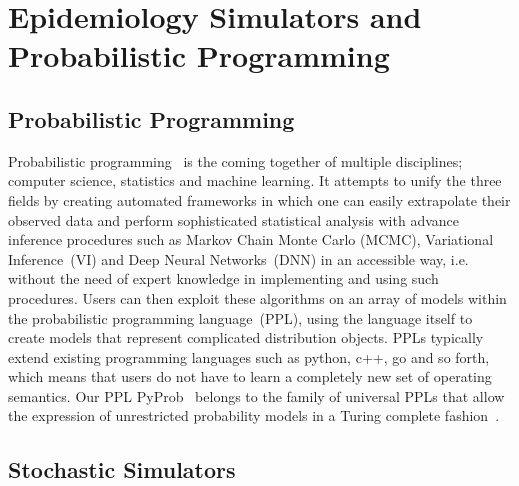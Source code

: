 \documentclass{article}
\begin{document}
\section{Epidemiology Simulators and Probabilistic Programming}
\label{sec:background}



\subsection{Probabilistic Programming}
Probabilistic programming~\cite{gordon2014probabilistic,staton2016semantics,kozen1979semantics} is the coming together of multiple disciplines; computer science, statistics and machine learning. 
It attempts to unify the three fields by creating automated frameworks in which one can easily extrapolate their observed data and perform sophisticated statistical analysis with advance inference procedures such as 
Markov Chain Monte Carlo (MCMC), Variational Inference~(VI) and Deep Neural Networks~(DNN) in an accessible way, i.e. without the need of expert knowledge in implementing and using such procedures.
Users can then exploit these algorithms on an array of models
within the probabilistic programming language~(PPL), using the language itself to create models that represent complicated distribution objects. 
PPLs typically extend existing programming languages such as python, c++, go and so forth, which means that users do not have to learn
a completely new set of operating semantics.  
Our PPL PyProb~\cite{le-2016-inference,baydin2018efficient} belongs to the family of universal PPLs 
that allow the expression of unrestricted probability models in a Turing complete fashion~\cite{wood2014new,goodman2012church,landau_binder_2014,siddharth2017learning,bingham2019pyro}.

\subsection{Stochastic Simulators}
\end{document}
